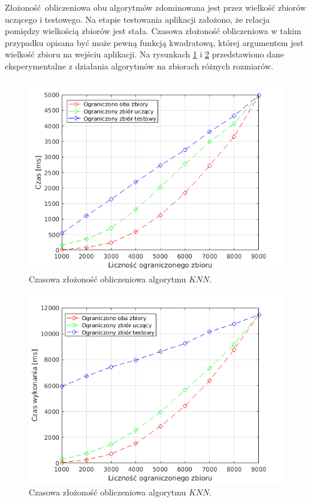 Złożoność obliczeniowa obu algorytmów zdominowana jest przez wielkość zbiorów uczącego i testowego. Na etapie testowania aplikacji założono, że relacja pomiędzy wielkością zbiorów jest stała. Czasowa złożoność obliczeniowa w takim przypadku opisana być może pewną funkcją kwadratową, której argumentem jest wielkość zbioru na wejściu aplikacji.
Na rysunkach \ref{fig:knn_compexity} i \ref{fig:enn_complexity} przedstawiono dane eksperymentalne z działania algorytmów na zbiorach różnych rozmiarów.

\begin{figure}[H]
	\centering
	\includegraphics[width=14cm]{img/knn_compexity}
	\caption{Czasowa złożoność obliczeniowa algorytmu $KNN$.}
	\label{fig:knn_compexity}
\end{figure}
\begin{figure}[H]
	\centering
	\includegraphics[width=14cm]{img/enn_complexity}
	\caption{Czasowa złożoność obliczeniowa algorytmu $KNN$.}
	\label{fig:enn_complexity}
\end{figure}

